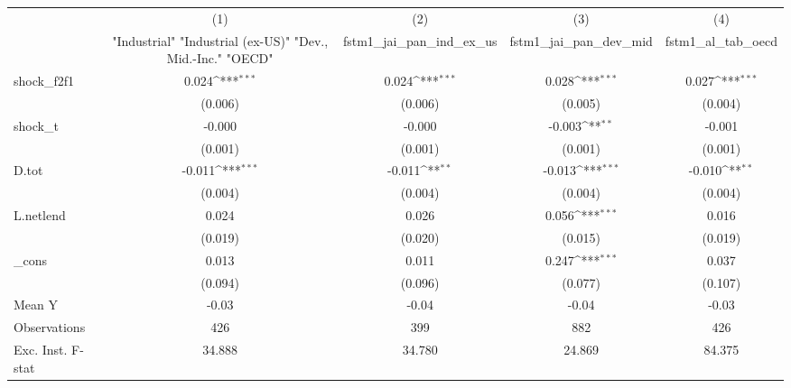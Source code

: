 {
\def\sym#1{\ifmmode^{#1}\else\(^{#1}\)\fi}
\begin{tabular}{l*{4}{c}}
\toprule
            &\multicolumn{1}{c}{(1)}&\multicolumn{1}{c}{(2)}&\multicolumn{1}{c}{(3)}&\multicolumn{1}{c}{(4)}\\
            &\multicolumn{1}{c}{ "Industrial" "Industrial (ex-US)" "Dev., Mid.-Inc." "OECD" }&\multicolumn{1}{c}{fstm1\_jai\_pan\_ind\_ex\_us}&\multicolumn{1}{c}{fstm1\_jai\_pan\_dev\_mid}&\multicolumn{1}{c}{fstm1\_al\_tab\_oecd}\\
\midrule
shock\_f2f1  &       0.024\sym{***}&       0.024\sym{***}&       0.028\sym{***}&       0.027\sym{***}\\
            &     (0.006)         &     (0.006)         &     (0.005)         &     (0.004)         \\
\addlinespace
shock\_t     &      -0.000         &      -0.000         &      -0.003\sym{**} &      -0.001         \\
            &     (0.001)         &     (0.001)         &     (0.001)         &     (0.001)         \\
\addlinespace
D.tot       &      -0.011\sym{***}&      -0.011\sym{**} &      -0.013\sym{***}&      -0.010\sym{**} \\
            &     (0.004)         &     (0.004)         &     (0.004)         &     (0.004)         \\
\addlinespace
L.netlend   &       0.024         &       0.026         &       0.056\sym{***}&       0.016         \\
            &     (0.019)         &     (0.020)         &     (0.015)         &     (0.019)         \\
\addlinespace
\_cons      &       0.013         &       0.011         &       0.247\sym{***}&       0.037         \\
            &     (0.094)         &     (0.096)         &     (0.077)         &     (0.107)         \\
\midrule
Mean Y      &       -0.03         &       -0.04         &       -0.04         &       -0.03         \\
Observations&         426         &         399         &         882         &         426         \\
Exc. Inst. F-stat&      34.888         &      34.780         &      24.869         &      84.375         \\
\bottomrule
\end{tabular}
}
